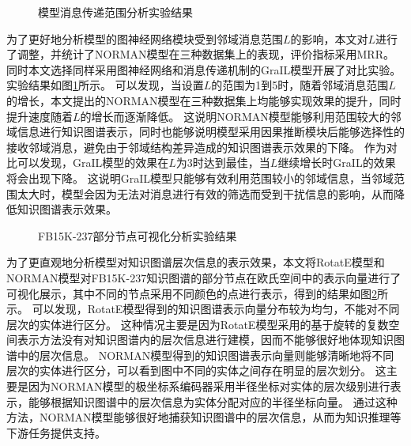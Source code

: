 \documentclass[algorithmlist, AutoFakeBold, AutoFakeSlant, figurelist, tablelist, nomlist, engineering]{seuthesix}
\begin{document}
\begin{figure}[t]
  \centering
  \caption{模型消息传递范围分析实验结果}
  \label{Experiment1_messageRange}
\end{figure}
为了更好地分析模型的图神经网络模块受到邻域消息范围$L$的影响，本文对$L$进行了调整，并统计了NORMAN模型在三种数据集上的表现，评价指标采用MRR。
同时本文选择同样采用图神经网络和消息传递机制的GraIL模型开展了对比实验。实验结果如图\ref{Experiment1_messageRange}所示。
可以发现，当设置$L$的范围为1到5时，随着邻域消息范围$L$的增长，本文提出的NORMAN模型在三种数据集上均能够实现效果的提升，同时提升速度随着$L$的增长而逐渐降低。
这说明NORMAN模型能够利用范围较大的邻域信息进行知识图谱表示，同时也能够说明模型采用因果推断模块后能够选择性的接收邻域消息，避免由于邻域结构差异造成的知识图谱表示效果的下降。
作为对比可以发现，GraIL模型的效果在$L$为3时达到最佳，当$L$继续增长时GraIL的效果将会出现下降。
这说明GraIL模型只能够有效利用范围较小的邻域信息，当邻域范围太大时，模型会因为无法对消息进行有效的筛选而受到干扰信息的影响，从而降低知识图谱表示效果。

\begin{figure}[t]
  \centering
  \caption{FB15K-237部分节点可视化分析实验结果}
  \label{Experiment1_figures}
\end{figure}
为了更直观地分析模型对知识图谱层次信息的表示效果，本文将RotatE模型和NORMAN模型对FB15K-237知识图谱的部分节点在欧氏空间中的表示向量进行了可视化展示，其中不同的节点采用不同颜色的点进行表示，得到的结果如图\ref{Experiment1_figures}所示。
可以发现，RotatE模型得到的知识图谱表示向量分布较为均匀，不能对不同层次的实体进行区分。
这种情况主要是因为RotatE模型采用的基于旋转的复数空间表示方法没有对知识图谱内的层次信息进行建模，因而不能够很好地体现知识图谱中的层次信息。
NORMAN模型得到的知识图谱表示向量则能够清晰地将不同层次的实体进行区分，可以看到图中不同的实体之间存在明显的层次划分。
这主要是因为NORMAN模型的极坐标系编码器采用半径坐标对实体的层次级别进行表示，能够根据知识图谱中的层次信息为实体分配对应的半径坐标向量。
通过这种方法，NORMAN模型能够很好地捕获知识图谱中的层次信息，从而为知识推理等下游任务提供支持。
\end{document}
